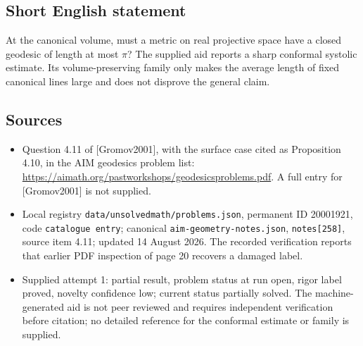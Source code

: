 \documentclass[11pt]{article}
\begin{document}
\subsection{Short English statement}
At the canonical volume, must a metric on real projective space have a closed geodesic of length at most \(\pi\)? The supplied aid reports a sharp conformal systolic estimate. Its volume-preserving family only makes the average length of fixed canonical lines large and does not disprove the general claim.
\subsection{Sources}
\begin{itemize}
\item Question 4.11 of [Gromov2001], with the surface case cited as Proposition 4.10, in the AIM geodesics problem list: \url{https://aimath.org/pastworkshops/geodesicsproblems.pdf}. A full entry for [Gromov2001] is not supplied.
\item Local registry \texttt{data/unsolvedmath/problems.json}, permanent ID 20001921, code \texttt{catalogue entry}; canonical \texttt{aim-geometry-notes.json}, \texttt{notes[258]}, source item 4.11; updated 14 August 2026. The recorded verification reports that earlier PDF inspection of page 20 recovers a damaged label.
\item Supplied attempt 1: partial result, problem status at run open, rigor label proved, novelty confidence low; current status partially solved. The machine-generated aid is not peer reviewed and requires independent verification before citation; no detailed reference for the conformal estimate or family is supplied.
\end{itemize}
\end{document}

